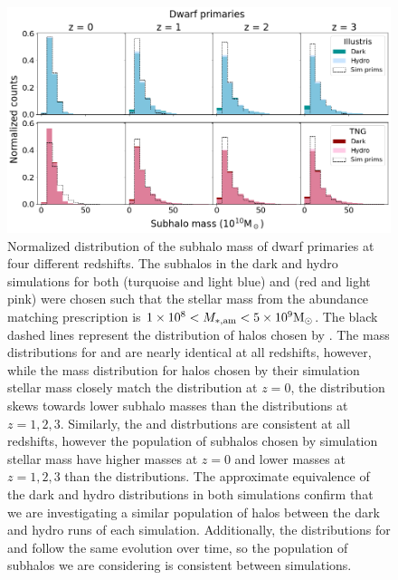 \documentclass[twocolumn]{aastex631}
\begin{document}
\begin{figure}[htb]
  \centering
  \includegraphics[width=\textwidth]{distributions_mass_dwarf.png}
  \caption{Normalized distribution of the subhalo mass of dwarf primaries at four different redshifts. The subhalos in the dark and hydro simulations for both \ill{} (turquoise and light blue) and \tng{} (red and light pink) were chosen such that the stellar mass from the abundance matching prescription is $1\times 10^{8} < M_{*,\mathrm{am}} < 5\times 10^{9} \rm M_\odot$. The black dashed lines represent the distribution of halos chosen by \mssim.
  The mass distributions for \illd{} and \illh{} are nearly identical at all redshifts, however, while the mass distribution for halos chosen by their simulation stellar mass closely match the \ill{} distribution at $z=0$, the \mssim{} distribution skews towards lower subhalo masses than the \msam{} distributions at $z=1,2,3$. Similarly, the \tngd{} and \tngh{} distrbutions are consistent at all redshifts, however the population of subhalos chosen by simulation stellar mass have higher masses at $z=0$ and lower masses at $z=1,2,3$ than the \msam{} distributions. 
  The approximate equivalence of the dark and hydro distributions in both simulations confirm that we are investigating a similar population of halos between the dark and hydro runs of each simulation. Additionally, the distributions for \ill{} and \tng{} follow the same evolution over time, so the population of subhalos we are considering is consistent between simulations. 
    }
  \label{fig:dist-mass-dwarf}
\end{figure}
\end{document}
